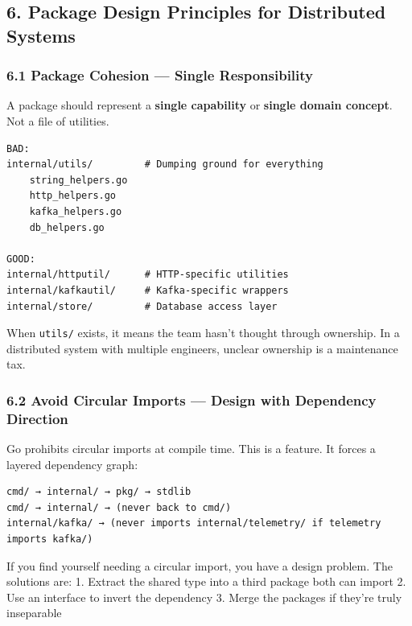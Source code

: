 \documentclass[
]{article}
\begin{document}
\hypertarget{package-design-principles-for-distributed-systems}{%
\subsection{6. Package Design Principles for Distributed
Systems}\label{package-design-principles-for-distributed-systems}}

\hypertarget{package-cohesion-single-responsibility}{%
\subsubsection{6.1 Package Cohesion --- Single
Responsibility}\label{package-cohesion-single-responsibility}}

A package should represent a \textbf{single capability} or
\textbf{single domain concept}. Not a file of utilities.

\begin{verbatim}
BAD:
internal/utils/         # Dumping ground for everything
    string_helpers.go
    http_helpers.go
    kafka_helpers.go
    db_helpers.go

GOOD:
internal/httputil/      # HTTP-specific utilities
internal/kafkautil/     # Kafka-specific wrappers
internal/store/         # Database access layer
\end{verbatim}

When \texttt{utils/} exists, it means the team hasn't thought through
ownership. In a distributed system with multiple engineers, unclear
ownership is a maintenance tax.

\hypertarget{avoid-circular-imports-design-with-dependency-direction}{%
\subsubsection{6.2 Avoid Circular Imports --- Design with Dependency
Direction}\label{avoid-circular-imports-design-with-dependency-direction}}

Go prohibits circular imports at compile time. This is a feature. It
forces a layered dependency graph:

\begin{verbatim}
cmd/ → internal/ → pkg/ → stdlib
cmd/ → internal/ → (never back to cmd/)
internal/kafka/ → (never imports internal/telemetry/ if telemetry imports kafka/)
\end{verbatim}

If you find yourself needing a circular import, you have a design
problem. The solutions are: 1. Extract the shared type into a third
package both can import 2. Use an interface to invert the dependency 3.
Merge the packages if they're truly inseparable
\end{document}
